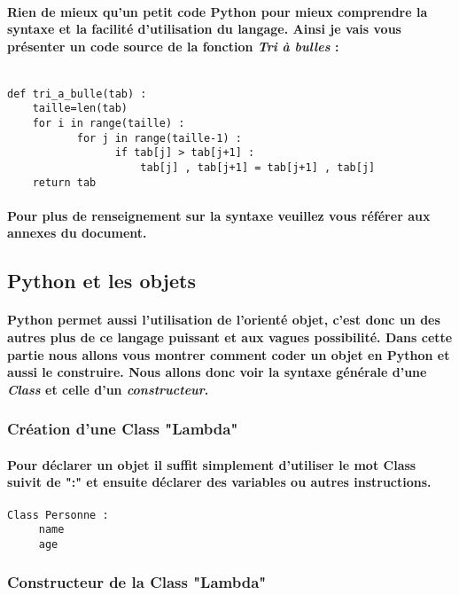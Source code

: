 \documentclass[a4paper, 12pt, twoside]{article}
\begin{document}
\paragraph{Rien de mieux qu'un petit code Python pour mieux comprendre la syntaxe et la facilité d'utilisation du langage. Ainsi je vais vous présenter un code source de la fonction \textit{Tri à bulles} :}

\begin{verbatim}

def tri_a_bulle(tab) :
    taille=len(tab)
    for i in range(taille) :
           for j in range(taille-1) : 
                 if tab[j] > tab[j+1] :
                     tab[j] , tab[j+1] = tab[j+1] , tab[j]
    return tab
\end{verbatim}
\paragraph{Pour plus de renseignement sur la syntaxe  veuillez vous référer aux annexes du document. }
\subsection{Python et les objets}
\paragraph{Python permet aussi l'utilisation de l'orienté objet, c'est donc un des autres plus de ce langage puissant et aux vagues possibilité. Dans cette partie nous allons vous montrer comment coder un objet en Python et aussi le construire. Nous allons donc voir la syntaxe générale d'une  \textit{Class} et celle d'un \textit{constructeur}.}

\subsubsection{Création d'une Class "Lambda" }
\paragraph{Pour déclarer un objet il suffit simplement d'utiliser le mot Class suivit de ":" et ensuite déclarer des variables ou autres instructions.}
\begin{verbatim}
Class Personne : 
     name
     age
\end{verbatim}
\subsubsection{Constructeur de la Class "Lambda"}
\end{document}
